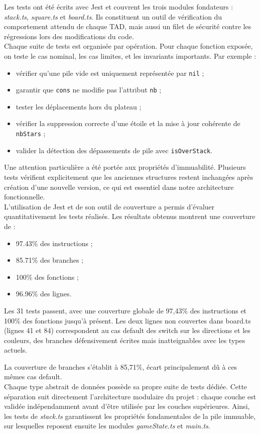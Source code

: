 Les tests ont été écrits avec Jest et couvrent les trois modules fondateurs : \textit{stack.ts}, \textit{square.ts} et \textit{board.ts}. Ils constituent un outil de vérification du comportement attendu de chaque TAD, mais aussi un filet de sécurité contre les régressions lors des modifications du code.
\\

Chaque suite de tests est organisée par opération. Pour chaque fonction exposée, on teste le cas nominal, les cas limites, et les invariants importants. Par exemple :
\begin{itemize}
  \item vérifier qu’une pile vide est uniquement représentée par \texttt{nil} ;
  \item garantir que \texttt{cons} ne modifie pas l’attribut \texttt{nb} ;
  \item tester les déplacements hors du plateau ;
  \item vérifier la suppression correcte d’une étoile et la mise à jour cohérente de \texttt{nbStars} ;
  \item valider la détection des dépassements de pile avec \texttt{isOverStack}.
\end{itemize}

Une attention particulière a été portée aux propriétés d’immuabilité. Plusieurs tests vérifient explicitement que les anciennes structures restent inchangées après création d’une nouvelle version, ce qui est essentiel dans notre architecture fonctionnelle.
\\

L’utilisation de Jest et de son outil de couverture a permis d’évaluer quantitativement les tests réalisés. Les résultats obtenus montrent une couverture de :
\begin{itemize}
\item 97.43\% des instructions ;
\item 85.71\% des branches ;
\item 100\% des fonctions ;
\item 96.96\% des lignes.
\end{itemize}

Les 31 tests passent, avec une couverture globale de 97,43\% des instructions et 100\% des fonctions jusqu’à présent. Les deux lignes non couvertes dans board.ts (lignes 41 et 84) correspondent au cas default des switch sur les directions et les couleurs, des branches défensivement écrites mais inatteignables avec les types actuels.

La couverture de branches s'établit à 85,71\%, écart principalement dû à ces mêmes cas default. 
\\

Chaque type abstrait de données possède sa propre suite de tests dédiée. Cette séparation suit directement l’architecture modulaire du projet : chaque couche est validée indépendamment avant d’être utilisée par les couches supérieures. Ainsi, les tests de \textit{stack.ts} garantissent les propriétés fondamentales de la pile immuable, sur lesquelles reposent ensuite les modules \textit{gameState.ts} et \textit{main.ts}.
